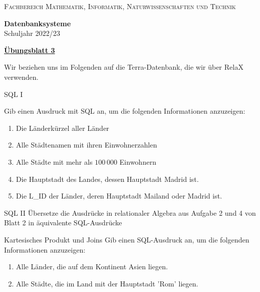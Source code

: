 \documentclass[12pt,a4paper,notitlepage,leqno]{article}
\begin{document}
\vspace{0.2cm}
\begin{minipage}[c]{0.5\textwidth}
\begin{center}
\textsc{Fachbereich Mathematik, Informatik, Naturwissenschaften und Technik}
\end{center}
\end{minipage}
\begin{minipage}[c]{0.5\textwidth}
\begin{center}
\textbf{Datenbanksysteme}\\
Schuljahr 2022/23
\end{center}
\end{minipage}

\begin{center}
\textbf{\underline{Übungsblatt 3}}

\vspace{0.2cm}
\end{center}

Wir beziehen uns im Folgenden auf die Terra-Datenbank, die wir über RelaX verwenden.

\begin{aufgabe}{SQL I}

Gib einen Ausdruck mit SQL an, um die folgenden Informationen anzuzeigen:

\begin{enumerate}
    \item Die Länderkürzel aller Länder
    \item Alle Städtenamen mit ihren Einwohnerzahlen
    \item Alle Städte mit mehr als $100\,000$ Einwohnern
    \item Die Hauptstadt des Landes, dessen Hauptstadt Madrid ist.
    \item Die L\_ID der Länder, deren Hauptstadt Mailand oder Madrid ist.
\end{enumerate}

\end{aufgabe}

\begin{aufgabe}{SQL II}
Übersetze die Ausdrücke in relationaler Algebra aus Aufgabe 2 und 4 von Blatt 2 in äquivalente SQL-Ausdrücke

\end{aufgabe}

\begin{aufgabe}{Kartesisches Produkt und Joins}
Gib einen SQL-Ausdruck an, um die folgenden Informationen anzuzeigen:
\begin{enumerate}
    \item Alle Länder, die auf dem Kontinent Asien liegen.
    \item Alle Städte, die im Land mit der Hauptstadt 'Rom' liegen.
\end{enumerate}    
\end{aufgabe}
\end{document}
